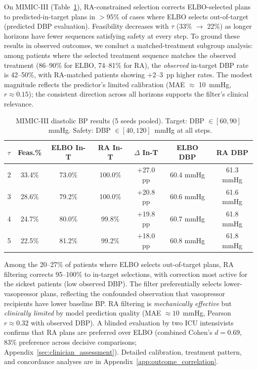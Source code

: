 \documentclass{article}
\begin{document}
On MIMIC-III (Table~\ref{tab:mimic}), RA-constrained selection corrects ELBO-selected plans to predicted-in-target plans in $>$95\% of cases where ELBO selects out-of-target (predicted DBP evaluation). Feasibility decreases with $\tau$ (33\% $\to$ 22\%) as longer horizons have fewer sequences satisfying safety at every step. To ground these results in observed outcomes, we conduct a matched-treatment subgroup analysis: among patients where the selected treatment sequence matches the observed treatment (86--90\% for ELBO, 74--81\% for RA), the \emph{observed} in-target DBP rate is 42--50\%, with RA-matched patients showing $+$2--3~pp higher rates. The modest magnitude reflects the predictor's limited calibration (MAE $\approx$ 10~mmHg, $r \approx 0.15$); the consistent direction across all horizons supports the filter's clinical relevance.

\begin{table}[t]
\centering
\caption{MIMIC-III diastolic BP results (5 seeds pooled). Target: DBP $\in [60,90]$~mmHg. Safety: DBP $\in [40, 120]$~mmHg at all steps.}
\label{tab:mimic}
\small
\begin{tabular}{l c c c c c c}
\toprule
$\tau$ & Feas.\% & ELBO In-T & RA In-T & $\Delta$ In-T & ELBO DBP & RA DBP \\
\midrule
2 & 33.4\% & 73.0\% & 100.0\% & $+$27.0 pp & 60.4 mmHg & 61.3 mmHg \\
3 & 28.6\% & 79.2\% & 100.0\% & $+$20.8 pp & 60.6 mmHg & 61.6 mmHg \\
4 & 24.7\% & 80.0\% & 99.8\% & $+$19.8 pp & 60.7 mmHg & 61.8 mmHg \\
5 & 22.5\% & 81.2\% & 99.2\% & $+$18.0 pp & 60.8 mmHg & 61.8 mmHg \\
\bottomrule
\end{tabular}
\end{table}

Among the 20--27\% of patients where ELBO selects out-of-target plans, RA filtering corrects 95--100\% to in-target selections, with correction most active for the sickest patients (low observed DBP). The filter preferentially selects lower-vasopressor plans, reflecting the confounded observation that vasopressor recipients have lower baseline BP. RA filtering is \emph{mechanically effective} but \emph{clinically limited} by model prediction quality (MAE $\approx 10$~mmHg, Pearson $r \approx 0.32$ with observed DBP). A blinded evaluation by two ICU intensivists confirms that RA plans are preferred over ELBO (combined Cohen's $d = 0.69$, 83\% preference across decisive comparisons; Appendix~\ref{sec:clinician_assessment}). Detailed calibration, treatment pattern, and concordance analyses are in Appendix~\ref{app:outcome_correlation}.
\end{document}
